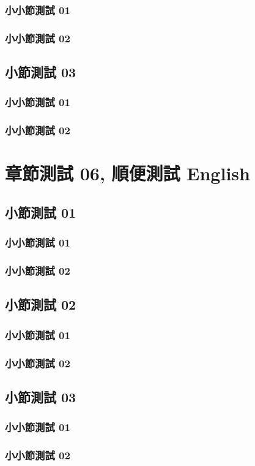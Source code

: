     \subsection{小小節測試 01}
    \lipsum[23]
    \subsection{小小節測試 02}
    \lipsum[23]
    \section{小節測試 03}
    \lipsum[23]
    \subsection{小小節測試 01}
    \lipsum[23]
    \subsection{小小節測試 02}
    \lipsum[23]

\chapter{章節測試 06, 順便測試 English}
    \section{小節測試 01}
    \lipsum[23]
    \subsection{小小節測試 01}
    \lipsum[23]
    \subsection{小小節測試 02}
    \lipsum[23]
    \section{小節測試 02}
    \lipsum[23]
    \subsection{小小節測試 01}
    \lipsum[23]
    \subsection{小小節測試 02}
    \lipsum[23]
    \section{小節測試 03}
    \lipsum[23]
    \subsection{小小節測試 01}
    \lipsum[23]
    \subsection{小小節測試 02}
    \lipsum[23]